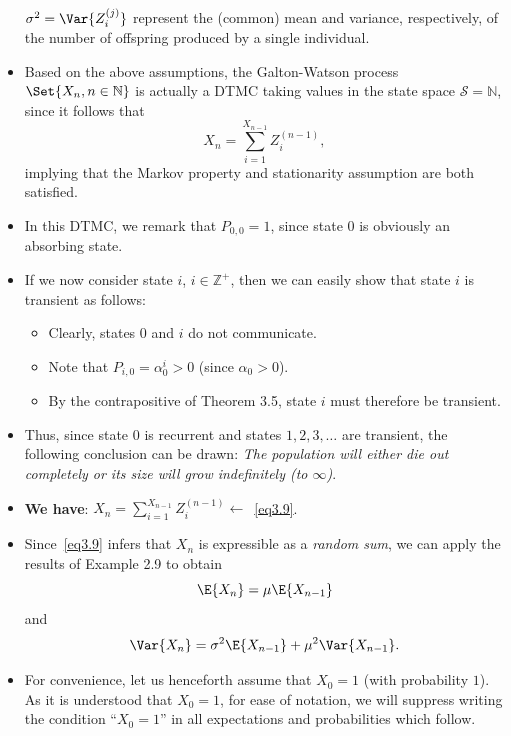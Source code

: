 \begin{itemize}
            $ \sigma^2=\Var{Z_i^{(j)}} $ represent the (common) mean and variance, respectively, of the number of offspring produced by a single
            individual.
      \item Based on the above assumptions, the Galton-Watson process $ \Set{X_n,n\in\mathbb{N}} $ is actually a DTMC
            taking values in the state space $ \mathcal{S}=\mathbb{N} $, since it follows that
            \[ X_n=\sum_{i=1}^{X_{n-1}} Z_i^{(n-1)},\label{eq3.9}\tag*{(3.9)} \]
            implying that the Markov property and stationarity assumption are both satisfied.
      \item In this DTMC, we remark that $ P_{0,0}=1 $, since state $0$ is obviously an absorbing state.
      \item If we now consider state $ i $, $ i\in\mathbb{Z}^+ $, then we can easily show that state $ i $ is transient as follows:
            \begin{itemize}
                  \item Clearly, states $ 0 $ and $ i $ do not communicate.
                  \item Note that $ P_{i,0}=\alpha_0^i>0 $ (since $ \alpha_0>0 $).
                  \item By the contrapositive of Theorem 3.5, state $i$ must therefore be transient.
            \end{itemize}
      \item Thus, since state $0$ is recurrent and states $ 1,2,3,\ldots $ are transient, the following conclusion can
            be drawn: \emph{The population will either die out completely or its size will grow indefinitely (to $ \infty $)}.
      \item \textbf{We have}: $ X_n=\sum_{i=1}^{X_{n-1}} Z_i^{(n-1)} \leftarrow $~\ref{eq3.9}.
      \item Since~\ref{eq3.9} infers that $X_n$ is expressible as a \emph{random sum}, we can apply the results of Example
            2.9 to obtain
            \[ \E{X_n}=\mu\E{X_{n-1}} \]
            and
            \[ \Var{X_n}=\sigma^2\E{X_{n-1}}+\mu^2\Var{X_{n-1}}. \]
      \item For convenience, let us henceforth assume that $X_0 = 1$ (with probability $1$). As it is
            understood that $X_0 = 1$, for ease of notation, we will suppress writing the condition ``$X_0 = 1$''
            in all expectations and probabilities which follow.
\end{itemize}
